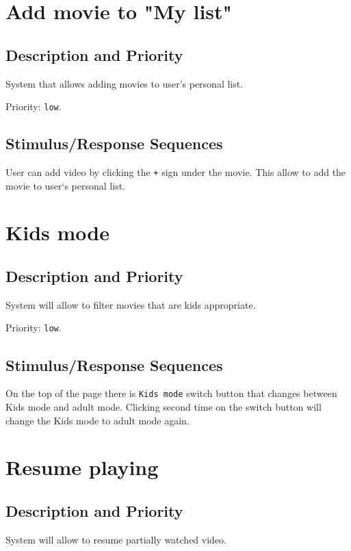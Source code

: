 \documentclass{scrreprt}
\begin{document}
\section {Add movie to "My list"}

\subsection{Description and Priority}

System that allows adding movies to user's personal list.

Priority: \verb|low|.

\subsection{Stimulus/Response Sequences}

User can add video by clicking the \verb|+| sign under the movie. This allow to add the movie to user`s personal list. 
\section{Kids mode}

\subsection{Description and Priority}

System will allow to filter movies that are kids appropriate.

Priority: \verb|low|.

\subsection{Stimulus/Response Sequences}

On the top of the page there is \verb|Kids mode| switch button that changes between Kids mode and adult mode. Clicking second time on the switch button will change the Kids mode to adult mode again.

\section{Resume playing}

\subsection{Description and Priority}

System will allow to resume partially watched video.
\end{document}
